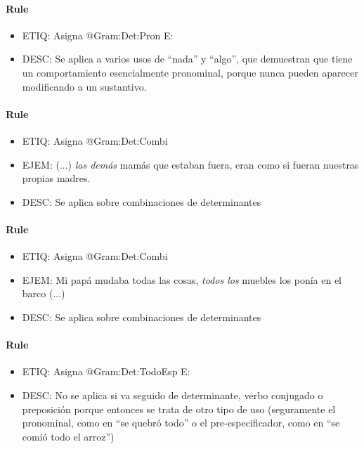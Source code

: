\documentclass[11pt]{report}
\begin{document}
\paragraph*{Rule}
\begin{itemize}
\item ETIQ: Asigna @Gram:Det:Pron
 E: 
\item DESC: Se aplica a varios usos de ``nada'' y ``algo'', que demuestran que tiene un comportamiento esencialmente pronominal, porque nunca pueden aparecer modificando a un sustantivo.
\end{itemize}

\paragraph*{Rule}
\begin{itemize}
\item ETIQ: Asigna @Gram:Det:Combi
\item EJEM: (...) \emph{las demás} mamás que estaban fuera, eran como si fueran nuestras propias madres.
\item DESC: Se aplica sobre combinaciones de determinantes
\end{itemize}

\paragraph*{Rule}
\begin{itemize}
\item ETIQ: Asigna @Gram:Det:Combi
\item EJEM: Mi papá mudaba todas las cosas, \emph{todos los} muebles los ponía en el barco (...)
\item DESC: Se aplica sobre combinaciones de determinantes
\end{itemize}

\paragraph*{Rule}
\begin{itemize}
\item ETIQ: Asigna @Gram:Det:TodoEsp
 E: 
\item DESC: No se aplica si va seguido de determinante, verbo conjugado o preposición porque entonces se trata de otro tipo de uso (seguramente el pronominal, como en ``se quebró todo'' o el pre-especificador, como en ``se comió todo el arroz'')
\end{itemize}
\end{document}
